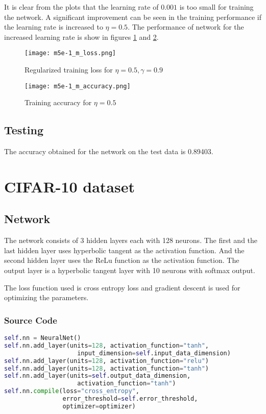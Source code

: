 \documentclass{article}
\begin{document}
It is clear from the plots that the learning rate of $0.001$ is too small for training the network. A
significant improvement can be seen in the training performance if the learning rate is increased to $\eta = 0.5$.
The performance of network for the increased learning rate is show in figures \ref{fig:mnist_one_loss} and \ref{fig:mnist_one_accuracy}.

\begin{figure}[!ht]
  \texttt{[image: m5e-1\_m\_loss.png]}
  \caption{Regularized training loss for $\eta = 0.5, \gamma = 0.9$}
  \label{fig:mnist_one_loss}
\end{figure}

\begin{figure}[!ht]
  \texttt{[image: m5e-1\_m\_accuracy.png]}
  \caption{Training accuracy for $\eta = 0.5$}
  \label{fig:mnist_one_accuracy}
\end{figure}

\subsection{Testing}
The accuracy obtained for the network on the test data is 0.89403.

\section {CIFAR-10 dataset}
\subsection{Network}
The network consists of 3 hidden layers each with 128 neurons.  The first and the last
hidden layer uses hyperbolic tangent as the activation function. And the second
hidden layer uses the ReLu function as the activation function. The output layer is
a hyperbolic tangent layer with 10 neurons with softmax output.

The loss function used is cross entropy loss and gradient descent is used for
optimizing the parameters.

\subsubsection{Source Code}
\begin{lstlisting}[language=python]
self.nn = NeuralNet()
self.nn.add_layer(units=128, activation_function="tanh",
                    input_dimension=self.input_data_dimension)
self.nn.add_layer(units=128, activation_function="relu")
self.nn.add_layer(units=128, activation_function="tanh")
self.nn.add_layer(units=self.output_data_dimension,
                    activation_function="tanh")
self.nn.compile(loss="cross_entropy",
                error_threshold=self.error_threshold,
                optimizer=optimizer)
\end{lstlisting}
\end{document}

